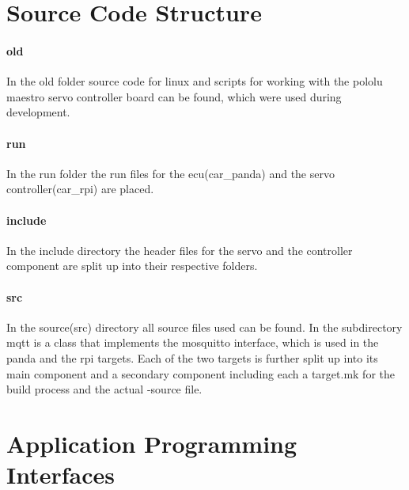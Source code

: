 \section{Source Code Structure}
\paragraph{old}
In the old folder source code for linux and scripts for working with the pololu maestro servo controller board can be found, which were used during development.

\paragraph{run}
In the run folder the run files for the ecu(car\_panda) and the servo controller(car\_rpi) are placed.

\paragraph{include}
In the include directory the header files for the servo and the controller component are split up into their respective folders.

\paragraph{src}
In the source(src) directory all source files used can be found. In the subdirectory mqtt is a class that implements the mosquitto interface, which is used in the panda and the rpi targets. Each of the two targets is further split up into its main component and a secondary component including each a target.mk for the build process and the actual \CC-source file.

\section{Application Programming Interfaces}

